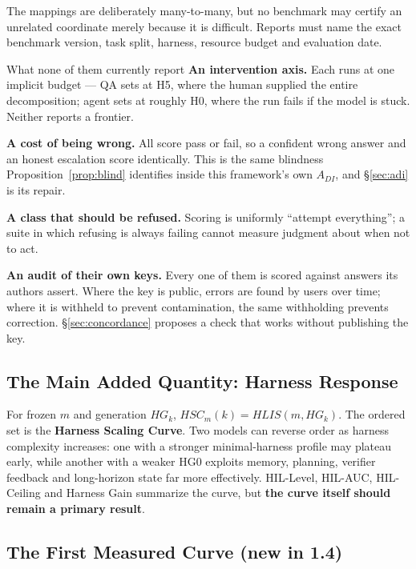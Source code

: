 \documentclass[11pt]{article}
\theoremstyle{definition}
\begin{document}
The mappings are deliberately many-to-many, but no benchmark may certify an unrelated coordinate merely because it is difficult. Reports must name the exact benchmark version, task split, harness, resource budget and evaluation date.

\begin{claimbox}{What none of them currently report}
\textbf{An intervention axis.} Each runs at one implicit budget --- QA sets at H5, where the human supplied the entire decomposition; agent sets at roughly H0, where the run fails if the model is stuck. Neither reports a frontier.

\textbf{A cost of being wrong.} All score pass or fail, so a confident wrong answer and an honest escalation score identically. This is the same blindness Proposition~\ref{prop:blind} identifies inside this framework's own $A_{DI}$, and \S\ref{sec:adi} is its repair.

\textbf{A class that should be refused.} Scoring is uniformly ``attempt everything''; a suite in which refusing is always failing cannot measure judgment about when not to act.

\textbf{An audit of their own keys.} Every one of them is scored against answers its authors assert. Where the key is public, errors are found by users over time; where it is withheld to prevent contamination, the same withholding prevents correction. \S\ref{sec:concordance} proposes a check that works without publishing the key.
\end{claimbox}

\subsection{The Main Added Quantity: Harness Response}

For frozen $m$ and generation $HG_k$, $HSC_m(k) = HLIS(m,HG_k)$. The ordered set is the \textbf{Harness Scaling Curve}. Two models can reverse order as harness complexity increases: one with a stronger minimal-harness profile may plateau early, while another with a weaker HG0 exploits memory, planning, verifier feedback and long-horizon state far more effectively. HIL-Level, HIL-AUC, HIL-Ceiling and Harness Gain summarize the curve, but \textbf{the curve itself should remain a primary result}.

\subsection{The First Measured Curve (new in 1.4)}\label{sec:measured}
\end{document}
